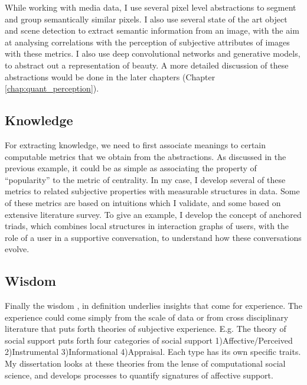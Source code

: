 While working with media data, I use several pixel level abstractions to segment and group semantically similar pixels. I also use several state of the art object and scene detection to extract semantic information from an image, with the aim at analysing correlations with the perception of subjective attributes of images with these metrics. I also use deep convolutional networks and generative models, to abstract out a representation of beauty. A more detailed discussion of these abstractions would be done in the later chapters (Chapter \ref{chap:quant_perception}).  

\subsection{Knowledge}
For extracting knowledge, we need to first associate meanings to certain computable metrics that we obtain from the abstractions. As discussed in the previous example, it could be as simple as associating the property of ``popularity'' to the metric of centrality. In my case, I develop several of these metrics to related subjective properties with measurable structures in data. Some of these metrics are based on intuitions which I validate, and some based on extensive literature survey. To give an example, I develop the concept of anchored triads, which combines local structures in interaction graphs of users, with the role of a user in a supportive conversation, to understand how these conversations evolve.

\subsection{Wisdom}
Finally the wisdom , in definition underlies insights that come for experience. The experience could come simply from the scale of data or from cross disciplinary literature that puts forth theories of subjective experience. E.g. The theory of social support puts forth four categories of social support 1)Affective/Perceived 2)Instrumental 3)Informational 4)Appraisal. Each type has its own specific traits. My dissertation looks at these theories from the lense of computational social science, and develops processes to quantify signatures of affective support.


